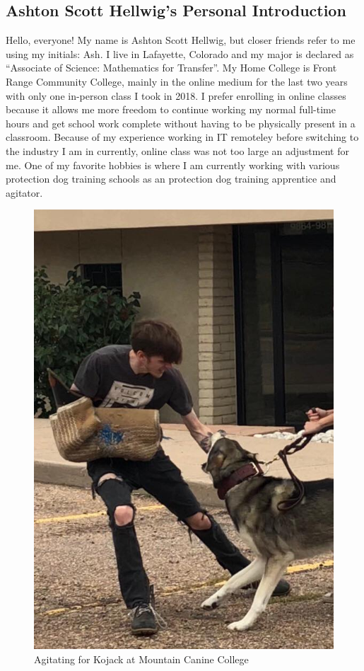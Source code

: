 \documentclass[stu,12pt]{apa7}
\begin{document}
    \newpage
    \subsection{Ashton Scott Hellwig's Personal Introduction}
      Hello, everyone! My name is Ashton Scott Hellwig, but closer friends refer
        to me using my initials: Ash. I live in Lafayette, Colorado and my major
        is declared as ``Associate of Science: Mathematics for Transfer''. My
        Home College is Front Range Community College, mainly in the online
        medium for the last two years with only one in-person class I took in
        2018. I prefer enrolling in online classes because it allows me more
        freedom to continue working my normal full-time hours and get school
        work complete without having to be physically present in a classroom.
        Because of my experience working in IT remoteley before switching to
        the industry I am in currently, online class was not too large an
        adjustment for me. One of my favorite hobbies is where I am currently
        working with various protection dog training schools as an protection
        dog training apprentice and agitator.

        \begin{figure}[h]
          \centering
          \caption{Agitating for Kojack at Mountain Canine College}
          \includegraphics[width=\textwidth]{KojackBiteWork1.jpg}
        \end{figure}
\end{document}

